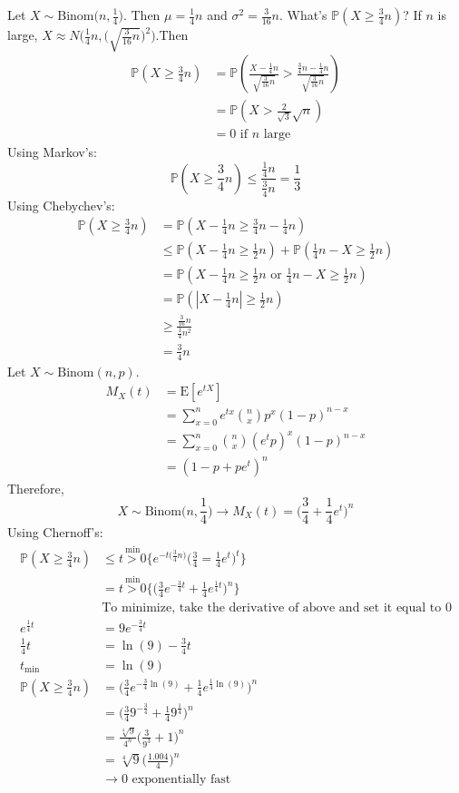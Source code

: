 \documentclass[12pt]{article}
\newcommand{\prob}[1]{\mathbb{P}(#1)}
\newcommand{\expected}[1]{\mathrm{E}[#1]}
\begin{document}
Let $X \sim \text{Binom}\Big(n, \frac{1}{4}\Big)$. Then $\mu = \frac{1}{4}n$ and $\sigma^2 = \frac{3}{16}n$. What's $\prob{X \geq \frac{3}{4}n}$? If $n$ is large, $X \approx N\Big(\frac{1}{4}n, \Big( \sqrt{\frac{3}{16}n}\Big)^2\Big)$.Then $$ \begin{aligned} \prob{X \geq \frac{3}{4}n} &= \prob{\frac{X - \frac{1}{4}n}{\sqrt{\frac{3}{16}n}} > \frac{\frac{3}{4}n - \frac{1}{4}n}{\sqrt{\frac{3}{16}n}}} \\ &= \prob{X > \frac{2}{\sqrt{3}}\sqrt{n}} \\ &= 0 \text{ if } n \text{ large } \end{aligned} $$ 
Using Markov's: $$ \prob{X \geq \frac{3}{4}n} \leq \frac{\frac{1}{4}n}{\frac{3}{4}n} = \frac{1}{3} $$ 
Using Chebychev's: $$ \begin{aligned} \prob{X \geq \frac{3}{4}n} &= \prob{X - \frac{1}{4}n \geq \frac{3}{4}n - \frac{1}{4}n} \\ &\leq \prob{X - \frac{1}{4}n \geq \frac{1}{2}n} + \prob{\frac{1}{4}n - X \geq \frac{1}{2}n} \\ &= \prob{X - \frac{1}{4}n \geq \frac{1}{2}n \text{ or } \frac{1}{4}n - X \geq \frac{1}{2}n} \\ &= \prob{|X - \frac{1}{4}n| \geq \frac{1}{2}n} \\ &\geq \frac{\frac{3}{16}n}{\frac{1}{4}n^2} \\ &= \frac{3}{4}n \end{aligned} $$ 
Let $X \sim \text{Binom}(n,p)$. $$ \begin{aligned} M_X(t) &= \expected{e^{tX}} \\ &= \sum_{x = 0}^n e^{tx}\binom{n}{x}p^x(1-p)^{n-x} \\ &= \sum_{x=0}^n \binom{n}{x} (e^tp)^x(1-p)^{n-x} \\ &= (1-  p + pe^t)^n \end{aligned} $$ Therefore, $$ X \sim \text{Binom}\Big(n, \frac{1}{4}\Big) \to M_X(t) = \Big( \frac{3}{4} + \frac{1}{4}e^t\Big)^n $$ 
Using Chernoff's: $$ \begin{aligned} \prob{X \geq \frac{3}{4}n} &\leq \stackrel{\text{min}}{t > 0} \Big\{ e^{-t\Big( \frac{3}{4}n\Big)} \Big( \frac{3}{4} = \frac{1}{4}e^t\Big)^t\Big\} \\ &= \stackrel{\text{min}}{t > 0} \Big\{ \Big( \frac{3}{4} e^{-\frac{3}{4}t} + \frac{1}{4}e^{\frac{1}{4}t}\Big)^n\Big\} \\ &\text{To minimize, take the derivative of above and set it equal to } 0 \\ e^{\frac{1}{4}t} &= 9e^{-\frac{3}{4}t} \\ \frac{1}{4}t &= \ln(9) - \frac{3}{4}t \\ t_{\text{min}} &= \ln(9) \\ \prob{X \geq \frac{3}{4}n} &= \Big( \frac{3}{4}e^{-\frac{3}{4}\ln(9)} + \frac{1}{4}e^{\frac{1}{4}\ln(9)}\Big)^n \\ &= \Big( \frac{3}{4}9^{-\frac{3}{4}} + \frac{1}{4}9^{\frac{1}{4}}\Big)^n \\ &= \frac{\sqrt[4]{9}}{4^n} \Big( \frac{3}{9^3} + 1\Big)^n \\ &= \sqrt[4]{9} \Big( \frac{1.004}{4} \Big)^n \\ &\to 0 \text{ exponentially fast} \end{aligned} $$ 
\end{document}
